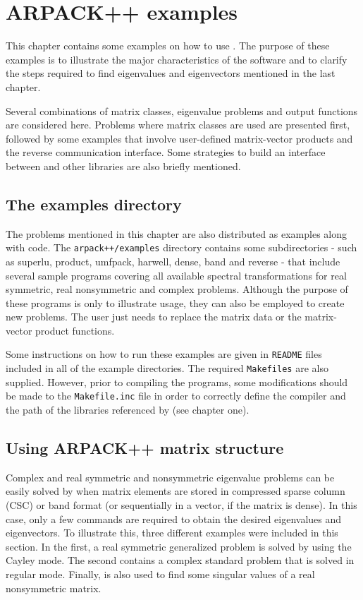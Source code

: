\chapter{ARPACK++ examples}

This chapter contains some examples on how to use \ARPP{}. The purpose of these examples is to illustrate the major characteristics of the software and to clarify the steps required to find eigenvalues and eigenvectors mentioned in the last chapter.

Several combinations of matrix classes, eigenvalue problems and output functions are considered here. Problems where \ARPP{} matrix classes are used are presented first, followed by some examples that involve user-defined matrix-vector products and the reverse communication interface. Some strategies to build an interface between \ARPP{} and other libraries are also briefly mentioned.

\section{The examples directory}

The problems mentioned in this chapter are also distributed as examples along with \ARPP{} code. The \texttt{arpack++/examples} directory contains some subdirectories - such as superlu, product, umfpack, harwell, dense, band and reverse - that include several sample programs covering all available spectral transformations for real symmetric, real nonsymmetric and complex problems. Although the purpose of these programs is only to illustrate \ARPP{} usage, they can also be employed to create new problems. The user just needs to replace the matrix data or the matrix-vector product functions.

Some instructions on how to run these examples are given in \texttt{README} files included in all of the example directories. The required \texttt{Makefiles} are also supplied. However, prior to compiling the programs, some modifications should be made to the \texttt{Makefile.inc} file in order to correctly define the compiler and the path of the libraries referenced by \ARPP{} (see chapter one).

\section{Using ARPACK++ matrix structure}

Complex and real symmetric and nonsymmetric eigenvalue problems can be easily solved by \ARPP{} when matrix elements are stored in compressed sparse column (CSC) or band format (or sequentially in a vector, if the matrix is dense). In this case, only a few commands are required to obtain the desired eigenvalues and eigenvectors. To illustrate this, three different examples were included in this section. In the first, a real symmetric generalized problem is solved by using the Cayley mode. The second contains a complex standard problem that is solved in regular mode. Finally, \ARPP{} is also used to find some singular values of a real nonsymmetric matrix.

